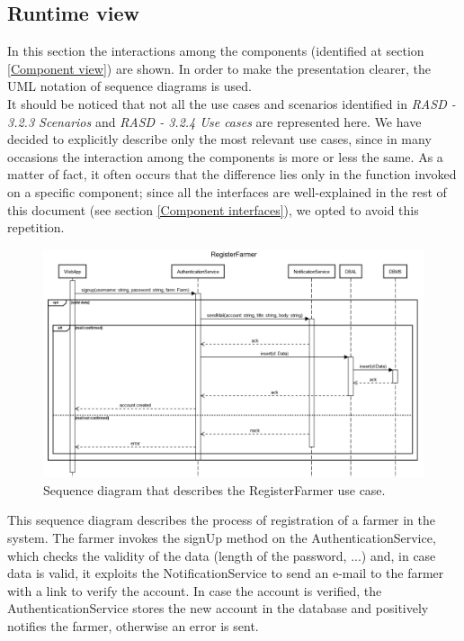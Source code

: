 \documentclass{article}
\begin{document}
\subsection{Runtime view}
\justifying
In this section the interactions among the components (identified at section \ref{Component view}) are shown. In order to make the presentation clearer, the UML notation of sequence diagrams is used.\\ It should be noticed that not all the use cases and scenarios identified in \textit{RASD - 3.2.3 Scenarios} and \textit{RASD - 3.2.4 Use cases} are represented here. We have decided to explicitly describe only the most relevant use cases, since in many occasions the interaction among the components is more or less the same. As a matter of fact, it often occurs that the difference lies only in the function invoked on a specific component; since all the interfaces are well-explained in the rest of this document (see section \ref{Component interfaces}), we opted to avoid this repetition.
\newpage
\begin{figure}[H]
   \centering
   \includegraphics[scale=0.30]{diagrams/sequence diagrams/RegisterFarmer.png}
    \caption{Sequence diagram that describes the RegisterFarmer use case.}
\end{figure}
This sequence diagram describes the process of registration of a farmer in the system. The farmer invokes the signUp method on the AuthenticationService, which checks the validity of the data (length of the password, ...) and, in case data is valid, it exploits the NotificationService to send an e-mail to the farmer with a link to verify the account. In case the account is verified, the AuthenticationService stores the new account in the database and positively notifies the farmer, otherwise an error is sent.
\end{document}
